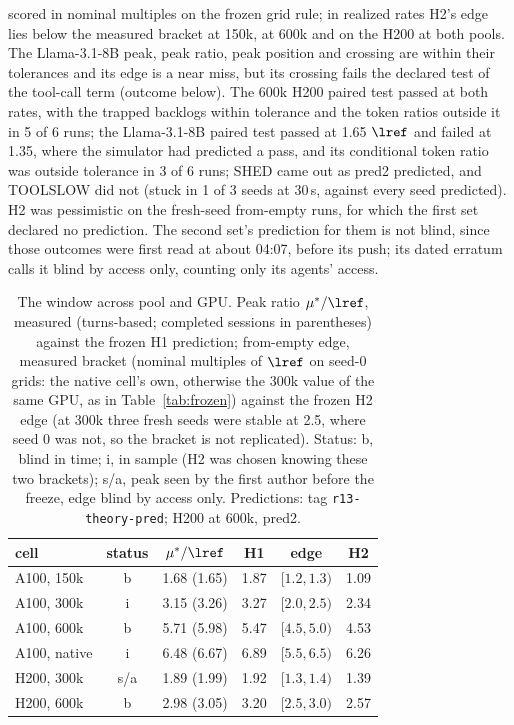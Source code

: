scored in nominal multiples on the frozen grid rule; in realized rates H2's edge lies below the measured bracket at 150k, at 600k and on the H200 at both pools. The Llama-3.1-8B peak, peak ratio, peak position and crossing are within their tolerances and its edge is a near miss, but its crossing fails the declared test of the tool-call term (outcome below). The 600k H200 paired test passed at both rates, with the trapped backlogs within tolerance and the token ratios outside it in 5 of 6 runs; the Llama-3.1-8B paired test passed at 1.65 $\lref$ and failed at 1.35, where the simulator had predicted a pass, and its conditional token ratio was outside tolerance in 3 of 6 runs; SHED came out as pred2 predicted, and TOOLSLOW did not (stuck in 1 of 3 seeds at 30\,s, against every seed predicted). H2 was pessimistic on the fresh-seed from-empty runs, for which the first set declared no prediction. The second set's prediction for them is not blind, since those outcomes were first read at about 04:07, before its push; its dated erratum calls it blind by access only, counting only its agents' access.

\begin{table}[t]
\centering\footnotesize
\caption{The window across pool and GPU. Peak ratio $\mu^*/\lref$, measured (turns-based; completed sessions in parentheses) against the frozen H1 prediction; from-empty edge, measured bracket (nominal multiples of $\lref$ on seed-0 grids: the native cell's own, otherwise the 300k value of the same GPU, as in Table~\ref{tab:frozen}) against the frozen H2 edge (at 300k three fresh seeds were stable at 2.5, where seed 0 was not, so the bracket is not replicated). Status: b, blind in time; i, in sample (H2 was chosen knowing these two brackets); s/a, peak seen by the first author before the freeze, edge blind by access only. Predictions: tag \texttt{r13-theory-pred}; H200 at 600k, pred2.}\label{tab:windowlaw}
\setlength{\tabcolsep}{3pt}
\begin{tabular}{@{}l c c c c c@{}}
\toprule
cell & status & $\mu^*/\lref$ & H1 & edge & H2\\
\midrule
A100, 150k & b & 1.68 (1.65) & 1.87 & $[1.2,1.3)$ & 1.09\\
A100, 300k & i & 3.15 (3.26) & 3.27 & $[2.0,2.5)$ & 2.34\\
A100, 600k & b & 5.71 (5.98) & 5.47 & $[4.5,5.0)$ & 4.53\\
A100, native & i & 6.48 (6.67) & 6.89 & $[5.5,6.5)$ & 6.26\\
H200, 300k & s/a & 1.89 (1.99) & 1.92 & $[1.3,1.4)$ & 1.39\\
H200, 600k & b & 2.98 (3.05) & 3.20 & $[2.5,3.0)$ & 2.57\\
\bottomrule
\end{tabular}
\end{table}

